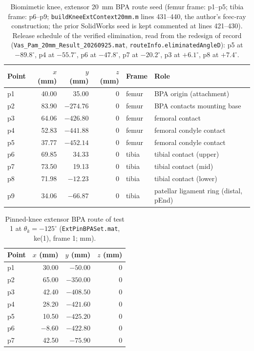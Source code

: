 \begin{table}
\caption{Biomimetic knee, extensor \qty{20}{\mm} BPA route seed (femur frame: p1--p5; tibia frame: p6--p9; \texttt{buildKneeExtContext20mm.m} lines 431--440, the author's fcec-ray construction; the prior SolidWorks seed is kept commented at lines 421--430). Release schedule of the verified elimination, read from the redesign of record (\texttt{Vas\_Pam\_20mm\_Result\_20260925.mat}, \texttt{routeInfo.eliminatedAngleD}): p5 at $-89.8^{\circ}$, p4 at $-55.7^{\circ}$, p6 at $-47.8^{\circ}$, p7 at $-20.2^{\circ}$, p3 at $+6.1^{\circ}$, p8 at $+7.4^{\circ}$.}
\label{tab:app_ext_seed}
\begin{tabular}{@{}lrrrll@{}}
\toprule
\textbf{Point} & $x$ (mm) & $y$ (mm) & $z$ (mm) & \textbf{Frame} & \textbf{Role} \\
\midrule
p1 & 40.00 & 35.00  & 0 & femur & BPA origin (attachment) \\
p2 & 83.90 & $-274.76$ & 0 & femur & BPA contacts mounting base \\
p3 & 64.06 & $-426.80$ & 0 & femur & femoral contact \\
p4 & 52.83 & $-441.88$ & 0 & femur & femoral condyle contact \\
p5 & 37.77 & $-452.14$ & 0 & femur & femoral condyle contact \\
p6 & 69.85 & 34.33  & 0 & tibia & tibial contact (upper) \\
p7 & 73.50 & 19.13  & 0 & tibia & tibial contact (mid) \\
p8 & 71.98 & $-12.23$ & 0 & tibia & tibial contact (lower) \\
p9 & 34.06 & $-66.87$ & 0 & tibia & patellar ligament ring (distal, pEnd) \\
\bottomrule
\end{tabular}
\end{table}

\begin{table}[htbp]
\caption{Pinned-knee extensor BPA route of test 1 at $\theta_{k}=-125^{\circ}$ (\texttt{ExtPinBPASet.mat}, ke(1), frame 1; mm).}
\label{tab:app_extpin_route}
\begin{tabular}{@{}lrrr@{}}
\toprule
\textbf{Point} & $x$ (mm) & $y$ (mm) & $z$ (mm) \\
\midrule
p1 & 30.00  & $-50.00$ & 0 \\
p2 & 65.00  & $-350.00$ & 0 \\
p3 & 42.40  & $-408.50$ & 0 \\
p4 & 28.20  & $-421.60$ & 0 \\
p5 & 10.50  & $-425.20$ & 0 \\
p6 & $-8.60$ & $-422.80$ & 0 \\
p7 & 42.50  & $-75.90$ & 0 \\
\bottomrule
\end{tabular}
\end{table}

